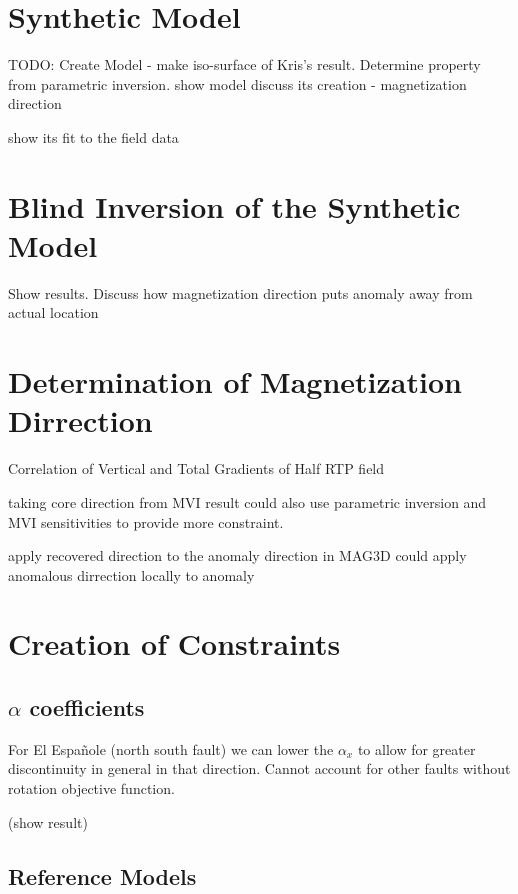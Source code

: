 \section{Synthetic Model}
\label{sec:Synthetic Mode:ElPoma1l}

TODO: Create Model
- make iso-surface of Kris's result. Determine property from parametric inversion.
show model
discuss its creation
- magnetization direction

show its fit to the field data

\section{Blind Inversion of the Synthetic Model}
\label{sec:Blind Inversion of the Synthetic Mode1:ElPoma1}

Show results. Discuss how magnetization direction puts anomaly away from actual location

\section{Determination of Magnetization Dirrection}
\label{sec:Determination of Magnetization Dirrection}

Correlation of Vertical and Total Gradients of Half RTP field \cite{dannemiller2006MagDirection}

taking core direction from MVI result 
could also use parametric inversion and MVI sensitivities to provide more constraint.

apply recovered direction to the anomaly direction in MAG3D
could apply anomalous dirrection locally to anomaly 

\section{Creation of Constraints}
\label{sec:Creation of Constraints:ElPoma1}

\subsection{$\alpha$ coefficients}
\label{sec:alpha coefficients:ElPoma1}

For El Espa\~nole (north south fault) we can lower the $\alpha_x$ to allow for greater discontinuity in general in that direction. Cannot account for other faults without rotation objective function.

(show result)

\subsection{Reference Models}
\label{sec:Reference Models:ElPoma1}

